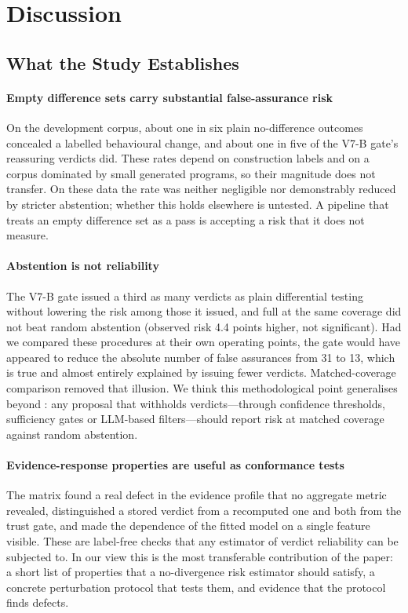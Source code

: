 \section{Discussion}\label{sec:discussion}

\subsection{What the Study Establishes}
\paragraph*{Empty difference sets carry substantial false-assurance risk} On the development corpus, about one in six plain no-difference outcomes concealed a labelled behavioural change, and about one in five of the V7-B gate's reassuring verdicts did. These rates depend on construction labels and on a corpus dominated by small generated programs, so their magnitude does not transfer. On these data the rate was neither negligible nor demonstrably reduced by stricter abstention; whether this holds elsewhere is untested. A pipeline that treats an empty difference set as a pass is accepting a risk that it does not measure.

\paragraph*{Abstention is not reliability} The V7-B gate issued a third as many \NDO{} verdicts as plain differential testing without lowering the risk among those it issued, and full \cec{} at the same coverage did not beat random abstention (observed risk 4.4 points higher, not significant). Had we compared these procedures at their own operating points, the gate would have appeared to reduce the absolute number of false assurances from 31 to 13, which is true and almost entirely explained by issuing fewer verdicts. Matched-coverage comparison removed that illusion. We think this methodological point generalises beyond \sbg{}: any proposal that withholds verdicts---through confidence thresholds, sufficiency gates or LLM-based filters---should report risk at matched coverage against random abstention.

\paragraph*{Evidence-response properties are useful as conformance tests} The \ers{} matrix found a real defect in the evidence profile that no aggregate metric revealed, distinguished a stored verdict from a recomputed one and both from the \sbg{} trust gate, and made the dependence of the fitted model on a single feature visible. These are label-free checks that any estimator of verdict reliability can be subjected to. In our view this is the most transferable contribution of the paper: a short list of properties that a no-divergence risk estimator should satisfy, a concrete perturbation protocol that tests them, and evidence that the protocol finds defects.

